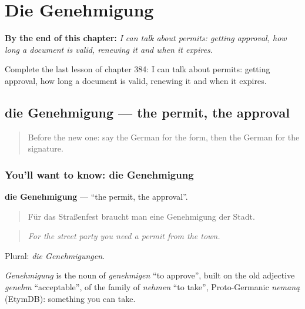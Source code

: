 
\chapter{Die Genehmigung}
\label{ch:ge-die-genehmigung}

\begin{chapteropening}
\textbf{By the end of this chapter:} \emph{I can talk about permits: getting approval, how long a document is valid, renewing it and when it expires.}

Complete the last lesson of chapter 384: I can talk about permits: getting approval, how long a document is valid, renewing it and when it expires.
\end{chapteropening}

\section[die Genehmigung]{die Genehmigung — the permit, the approval}

\label{lesson:GE-C384-genehmigung}



\begin{quote}
Before the new one: say the German for the form, then the German for the signature.
\end{quote}

\subsection*{You'll want to know: die Genehmigung}
\textbf{die Genehmigung} — \textquotedblleft{}the permit, the approval\textquotedblright{}.

\begin{quote}
Für das Straßenfest braucht man eine Genehmigung der Stadt.
\end{quote}

\begin{quote}
\emph{For the street party you need a permit from the town.}
\end{quote}

Plural: \emph{die Genehmigungen}.

\begin{cousinweb}
\emph{Genehmigung} is the noun of \emph{genehmigen} \textquotedblleft{}to approve\textquotedblright{}, built on the old adjective \emph{genehm} \textquotedblleft{}acceptable\textquotedblright{}, of the family of \emph{nehmen} \textquotedblleft{}to take\textquotedblright{}, Proto-Germanic \emph{nemaną} (EtymDB): something you can take.
\end{cousinweb}

